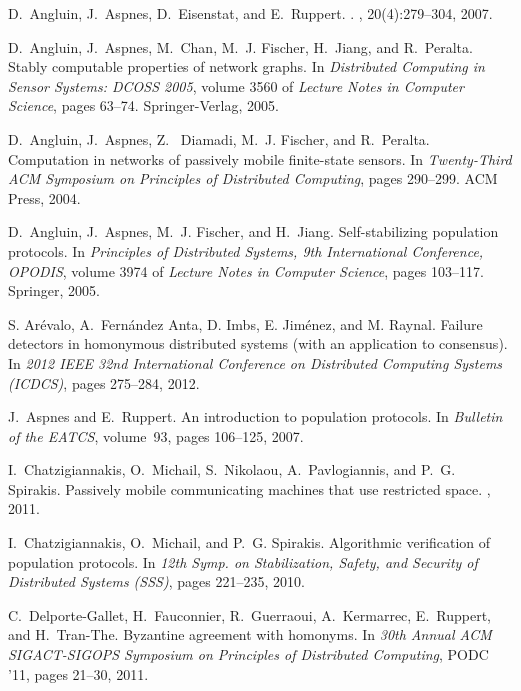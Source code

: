 \documentclass[UKenglish]{llncs}
\begin{document}
\begin{thebibliography}{10}

D.~Angluin, J.~Aspnes, D.~Eisenstat, and E.~Ruppert.
.
, 20(4):279--304, 2007.

D.~Angluin, J.~Aspnes, M.~Chan, M.~J. Fischer, H.~Jiang, and
  R.~Peralta.
\newblock Stably computable properties of network graphs.
\newblock In {\em Distributed Computing in Sensor Systems: DCOSS 2005}, volume 3560 of {\em Lecture Notes in Computer Science},
  pages 63--74. Springer-Verlag, 2005.

D.~Angluin, J.~Aspnes, Z.~ Diamadi, M.~J. Fischer, and R.~Peralta.
\newblock Computation in networks of passively mobile finite-state sensors.
\newblock In {\em Twenty-Third ACM Symposium on Principles of Distributed
  Computing}, pages 290--299. ACM Press,  2004.

D.~Angluin, J.~Aspnes, M.~J. Fischer, and H.~Jiang.
\newblock Self-stabilizing population protocols.
\newblock In {\em Principles of Distributed Systems, 9th International
  Conference, OPODIS}, volume  3974 of {\em Lecture Notes in Computer Science}, pages 103--117.
  Springer, 2005.

S. Ar{\'{e}}valo, A.~Fern{\'{a}}ndez Anta, D. Imbs, E.
  Jim{\'{e}}nez, and M. Raynal.
\newblock Failure detectors in homonymous distributed systems (with an
  application to consensus).
\newblock In {\em 2012 {IEEE} 32nd International Conference on Distributed
  Computing Systems (ICDCS)}, pages 275--284, 2012.

J.~Aspnes and E.~Ruppert.
\newblock An introduction to population protocols.
\newblock In {\em Bulletin of the EATCS}, volume~93, pages 106--125, 2007.

I.~Chatzigiannakis, O.~Michail, S.~Nikolaou, A.~Pavlogiannis, and P.~G.
  Spirakis.
\newblock Passively mobile communicating machines that use restricted space.
, 2011.

I.~Chatzigiannakis, O.~Michail, and P.~G. Spirakis.
\newblock Algorithmic verification of population protocols.
\newblock In {\em 12th Symp. on Stabilization, Safety, and Security of
  Distributed Systems (SSS)}, pages 221--235, 2010.

C.~Delporte-Gallet, H.~Fauconnier, R.~Guerraoui, A.~Kermarrec, E.~Ruppert, and H.~Tran-The.
\newblock Byzantine agreement with homonyms.
\newblock In {\em 30th Annual ACM SIGACT-SIGOPS Symposium on
  Principles of Distributed Computing}, PODC '11, pages 21--30,  2011.


\end{thebibliography}
\end{document}
